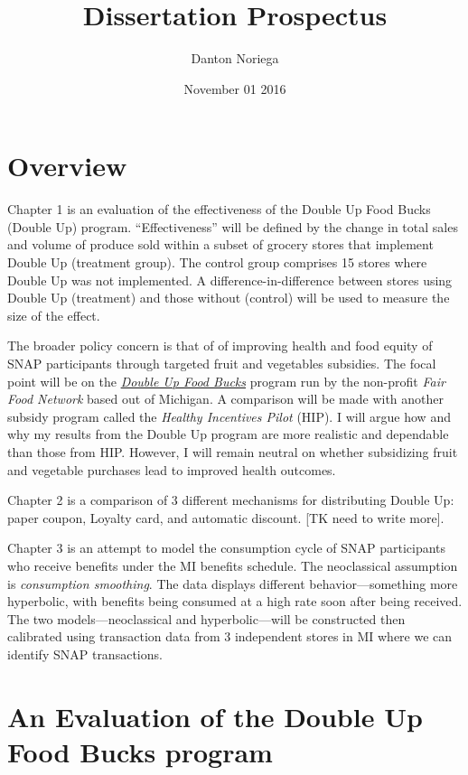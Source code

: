 \documentclass[12pt,letterpaperpaper,]{book}
\title{Dissertation Prospectus}
\author{Danton Noriega}
\date{November 01 2016}
\begin{document}
\maketitle

{
\setcounter{tocdepth}{1}
\tableofcontents
}
\chapter*{Overview}\label{overview}

Chapter 1 is an evaluation of the effectiveness of the Double Up Food
Bucks (Double Up) program. ``Effectiveness'' will be defined by the
change in total sales and volume of produce sold within a subset of
grocery stores that implement Double Up (treatment group). The control
group comprises 15 stores where Double Up was not implemented. A
difference-in-difference between stores using Double Up (treatment) and
those without (control) will be used to measure the size of the effect.

The broader policy concern is that of of improving health and food
equity of SNAP participants through targeted fruit and vegetables
subsidies. The focal point will be on the
\href{http://www.doubleupfoodbucks.org/}{\emph{Double Up Food Bucks}}
program run by the non-profit \emph{Fair Food Network} based out of
Michigan. A comparison will be made with another subsidy program called
the \emph{Healthy Incentives Pilot} (HIP). I will argue how and why my
results from the Double Up program are more realistic and dependable
than those from HIP. However, I will remain neutral on whether
subsidizing fruit and vegetable purchases lead to improved health
outcomes.

Chapter 2 is a comparison of 3 different mechanisms for distributing
Double Up: paper coupon, Loyalty card, and automatic discount. {[}TK
need to write more{]}.

Chapter 3 is an attempt to model the consumption cycle of SNAP
participants who receive benefits under the MI benefits schedule. The
neoclassical assumption is \emph{consumption smoothing}. The data
displays different behavior---something more hyperbolic, with benefits
being consumed at a high rate soon after being received. The two
models---neoclassical and hyperbolic---will be constructed then
calibrated using transaction data from 3 independent stores in MI where
we can identify SNAP transactions.

\chapter{An Evaluation of the Double Up Food Bucks
program}\label{an-evaluation-of-the-double-up-food-bucks-program}
\end{document}
